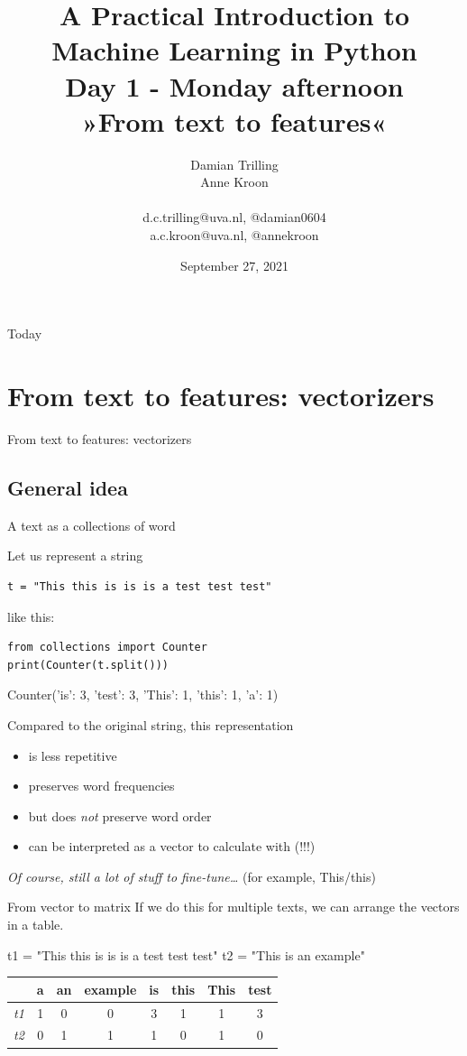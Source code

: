 \documentclass[compress]{beamer}
\title[Big Data and Automated Content Analysis]{\textbf{A Practical Introduction to Machine Learning in Python} \\Day 1 - Monday  afternoon \\ »From text to features«}
\author[Damian Trilling, Anne Kroon]{Damian Trilling \\ Anne Kroon \\ ~ \\ \footnotesize{d.c.trilling@uva.nl, @damian0604 \\a.c.kroon@uva.nl, @annekroon} \\}
\date{September 27, 2021}
\institute[Gesis]{Gesis}
\begin{document}
	
	\begin{frame}{}
	\titlepage
\end{frame}

\begin{frame}{Today}
\tableofcontents
\end{frame}


\section{From text to features: vectorizers}
\begin{frame}[plain]
From text to features: vectorizers
\end{frame}	



\subsection{General idea}

\begin{frame}[fragile]{A text as a collections of word}

Let us represent a string 
\begin{lstlisting}
t = "This this is is is a test test test"
\end{lstlisting}
like this:\\
\begin{lstlisting}
from collections import Counter
print(Counter(t.split()))
\end{lstlisting}
\begin{lstlistingoutput}
Counter({'is': 3, 'test': 3, 'This': 1, 'this': 1, 'a': 1})
\end{lstlistingoutput}

\pause 
Compared to the original string, this representation
\begin{itemize}
	\item is less repetitive
	\item preserves word frequencies
	\item but does \emph{not} preserve word order
	\item can be interpreted as a vector to calculate with (!!!)
\end{itemize}

\tiny{\emph{Of course, still a lot of stuff to fine-tune\ldots}  (for example, This/this)}
\end{frame}



\begin{frame}{From vector to matrix}
If we do this for multiple texts, we can arrange the vectors in a table.

t1 = "This this is is is a test test test" \newline
t2 = "This is an example"

\begin{tabular}{| c|c|c|c|c|c|c|c|}
	\hline
	& a & an & example & is & this & This & test \\
	\hline
	\emph{t1} & 1 & 0 & 0 & 3 & 1 & 1 & 3 \\
	\emph{t2} &0 & 1 & 1 & 1 & 0 & 1 & 0 \\
	\hline
\end{tabular}
\end{frame}
\end{document}
